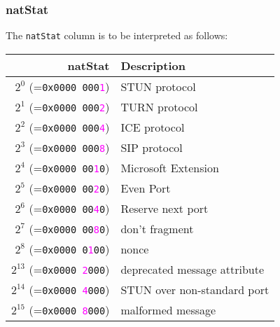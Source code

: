 \documentclass[documentation]{subfiles}
\begin{document}
\subsubsection{natStat}\label{natStat}
The {\tt natStat} column is to be interpreted as follows:%
    \begin{longtable}{rl}
        \toprule
        {\bf natStat} & {\bf Description}\\
        \midrule\endhead%
        $2^{0}$  (={\tt 0x0000 000\textcolor{magenta}{1}}) & STUN protocol\\
        $2^{1}$  (={\tt 0x0000 000\textcolor{magenta}{2}}) & TURN protocol\\
        $2^{2}$  (={\tt 0x0000 000\textcolor{magenta}{4}}) & ICE protocol\\
        $2^{3}$  (={\tt 0x0000 000\textcolor{magenta}{8}}) & SIP protocol\\
        $2^{4}$  (={\tt 0x0000 00\textcolor{magenta}{1}0}) & Microsoft Extension\\
        $2^{5}$  (={\tt 0x0000 00\textcolor{magenta}{2}0}) & Even Port\\
        $2^{6}$  (={\tt 0x0000 00\textcolor{magenta}{4}0}) & Reserve next port\\
        $2^{7}$  (={\tt 0x0000 00\textcolor{magenta}{8}0}) & don't fragment\\
        $2^{8}$  (={\tt 0x0000 0\textcolor{magenta}{1}00}) & nonce\\
        $2^{13}$ (={\tt 0x0000 \textcolor{magenta}{2}000}) & deprecated message attribute\\
        $2^{14}$ (={\tt 0x0000 \textcolor{magenta}{4}000}) & STUN over non-standard port\\
        $2^{15}$ (={\tt 0x0000 \textcolor{magenta}{8}000}) & malformed message\\

\end{longtable}
\end{document}
